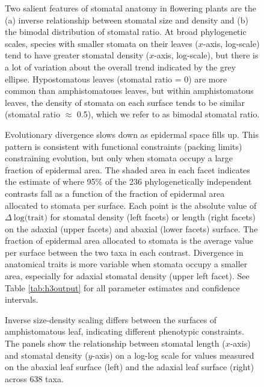 \documentclass[
  12pt,
]{article}
\begin{document}
\begin{figure}[ht]
\caption{Two salient features of stomatal anatomy in flowering plants are the (a) inverse relationship between stomatal size and density and (b) the bimodal distribution of stomatal ratio. At broad phylogenetic scales, species with smaller stomata on their leaves ($x$-axis, log-scale) tend to have greater stomatal density  ($x$-axis, log-scale), but there is a lot of variation about the overall trend indicated by the grey ellipse. Hypostomatous leaves (stomatal ratio = 0) are more common than amphistomatoues leaves, but within amphistomatous leaves, the density of stomata on each surface tends to be similar (stomatal ratio $\approx$ 0.5), which we refer to as bimodal stomatal ratio.}
\label{fig:concepts}
\end{figure}

\begin{figure}[ht]
\caption{Evolutionary divergence slows down as epidermal space fills up. This pattern is consistent with functional constraints (packing limits) constraining evolution, but only when stomata occupy a large fraction of epidermal area. The shaded area in each facet indicates the estimate of where 95\% of the 236 phylogenetically independent contrasts fall as a function of the fraction of epidermal area allocated to stomata per surface. Each point is the absolute value of  $\Delta~\textrm{log(trait)}$ for stomatal density (left facets) or length (right facets) on the adaxial (upper facets) and abaxial (lower facets) surface. The fraction of epidermal area allocated to stomata is the average value per surface between the two taxa in each contrast. Divergence in anatomical traits is more variable when stomata occupy a smaller area, especially for adaxial stomatal density (upper left facet). See Table \ref{tab:h3output} for all parameter estimates and confidence intervals.}
\label{fig:h3}
\end{figure}

\begin{figure}[ht]
\caption{Inverse size-density scaling differs between the surfaces of amphistomatous leaf, indicating different phenotypic constraints. The panels show the relationship between stomatal length ($x$-axis) and stomatal density ($y$-axis) on a log-log scale for values measured on the abaxial leaf surface (left) and the adaxial leaf surface (right) across 638 taxa.}
\label{fig:h1_raw}
\end{figure}
\end{document}
